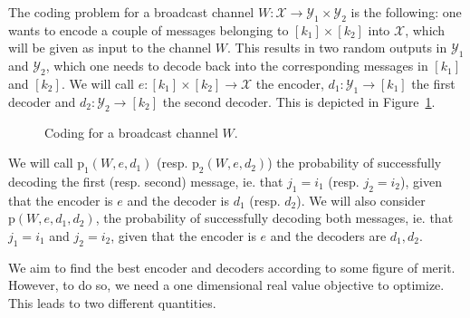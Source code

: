 The coding problem for a broadcast channel $W : \mathcal{X} \rightarrow \mathcal{Y}_1 \times \mathcal{Y}_2$ is the following: one wants to encode a couple of messages belonging to $[k_1] \times [k_2]$ into $\mathcal{X}$, which will be given as input to the channel $W$. This results in two random outputs in $\mathcal{Y}_1$ and $\mathcal{Y}_2$, which one needs to decode back into the corresponding messages in $[k_1]$ and $[k_2]$. We will call $e : [k_1] \times [k_2] \rightarrow \mathcal{X}$ the encoder, $d_1 : \mathcal{Y}_1 \rightarrow [k_1]$ the first decoder and $d_2 : \mathcal{Y}_2 \rightarrow [k_2]$ the second decoder. This is depicted in Figure~\ref{fig:BCcoding}.

\begin{figure}[!h]
\begin{center}
\end{center}
\label{fig:BCcoding}
\caption{Coding for a broadcast channel $W$.}
\end{figure}

We will call $\mathrm{p}_1(W,e,d_1)$ (resp. $\mathrm{p}_2(W,e,d_2)$) the probability of successfully decoding the first (resp. second) message, ie. that $j_1 = i_1$ (resp. $j_2 = i_2$), given that the encoder is $e$ and the decoder is $d_1$ (resp. $d_2$). We will also consider $\mathrm{p}(W,e,d_1,d_2)$, the probability of successfully decoding both messages, ie. that $j_1 = i_1$ and  $j_2 = i_2$, given that the encoder is $e$ and the decoders are $d_1,d_2$.

We aim to find the best encoder and decoders according to some figure of merit. However, to do so, we need a one dimensional real value objective to optimize. This leads to two different quantities.

